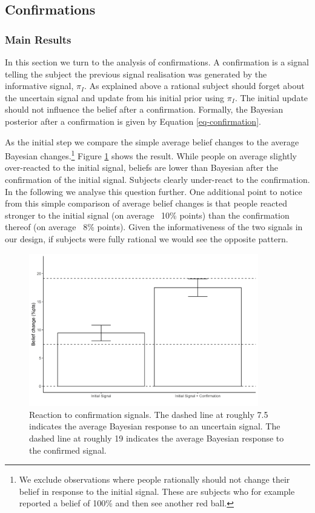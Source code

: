 \documentclass{article}
\begin{document}
\subsection{Confirmations}

\subsubsection{Main Results}

In this section we turn to the analysis of confirmations. A confirmation is a signal telling the subject the previous signal realisation was generated by the informative signal, $\pi_I$. As explained above a rational subject should forget about the uncertain signal and update from his initial prior using $\pi_I$. The initial update should not influence the belief after a confirmation. Formally, the Bayesian posterior after a confirmation is given by Equation \ref{eq-confirmation}.

As the initial step we compare the simple average belief changes to the average Bayesian changes.\footnote{We exclude observations where people rationally should not change their belief in response to the initial signal. These are subjects who for example reported a belief of 100\% and then see another red ball.} Figure \ref{fig:confirm_change} shows the result. While people on average slightly over-reacted to the initial signal, beliefs are lower than Bayesian after the confirmation of the initial signal. Subjects clearly under-react to the confirmation. In the following we analyse this question further. One additional point to notice from this simple comparison of average belief changes is that people reacted stronger to the initial signal (on average ~10\% points) than the confirmation thereof (on average ~8\% points). Given the informativeness of the two signals in our design, if subjects were fully rational we would see the opposite pattern.

\begin{figure}[!htb]
    \centering
    \includegraphics[width=10cm]{Fig/02_fig_confirm_change.jpg}
    \caption{Reaction to confirmation signals. The dashed line at roughly 7.5 indicates the average Bayesian response to an uncertain signal. The dashed line at roughly 19 indicates the average Bayesian response to the confirmed signal.}
    \label{fig:confirm_change}
\end{figure}
\end{document}

